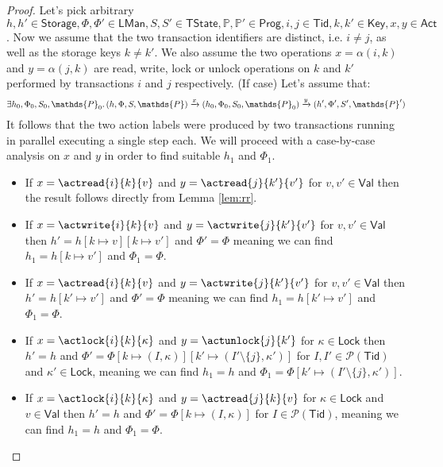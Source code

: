 \begin{proof}
Let's pick arbitrary $h, h' \in \mathsf{Storage}, \Phi, \Phi' \in \mathsf{LMan}, S, S' \in \mathsf{TState}, \mathds{P}, \mathds{P}' \in \mathsf{Prog}, i, j \in \mathsf{Tid}, k, k' \in \mathsf{Key}, x, y \in \mathsf{Act}$. Now we assume that the two transaction identifiers are distinct, i.e. $i \neq j$, as well as the storage keys $k \neq k'$. We also assume the two operations $x = \alpha(i, k)$ and $y = \alpha(j, k)$ are read, write, lock or unlock operations on $k$ and $k'$ performed by transactions $i$ and $j$ respectively. (If case) Let's assume that:
\begin{gather} \label{lem:xy1}
	\exists h_0, \Phi_0, S_0, \mathds{P}_0 \ldotp
	(h, \Phi, S, \mathds{P}) \xrightarrow{x} (h_0, \Phi_0, S_0, \mathds{P}_0)  \xrightarrow{y} (h', \Phi', S', \mathds{P}')
\end{gather}
It follows that the two action labels were produced by two transactions running in parallel executing a single step each. We will proceed with a case-by-case analysis on $x$ and $y$ in order to find suitable $h_1$ and $\Phi_1$.
\begin{itemize}
	\item If $x = \actread{i}{k}{v}$ and $y = \actread{j}{k'}{v'}$ for $v, v' \in \mathsf{Val}$ then the result follows directly from Lemma \ref{lem:rr}.
	\item If $x = \actwrite{i}{k}{v}$ and $y = \actwrite{j}{k'}{v'}$ for $v, v' \in \mathsf{Val}$ then $h' = h[k \mapsto v][k \mapsto v']$ and $\Phi' = \Phi$ meaning we can find $h_1 = h[k \mapsto v']$ and $\Phi_1 = \Phi$.
	\item If $x = \actread{i}{k}{v}$ and $y = \actwrite{j}{k'}{v'}$ for $v, v' \in \mathsf{Val}$ then $h' = h[k' \mapsto v']$ and $\Phi' = \Phi$ meaning we can find $h_1 = h[k' \mapsto v']$ and $\Phi_1 = \Phi$.
	\item If $x = \actlock{i}{k}{\kappa}$ and $y = \actunlock{j}{k'}$ for $\kappa \in \mathsf{Lock}$ then $h' = h$ and $\Phi' = \Phi[k \mapsto (I, \kappa)][k' \mapsto (I' \setminus \{j\}, \kappa')]$ for $I, I' \in \mathcal{P}(\mathsf{Tid})$ and $\kappa' \in \mathsf{Lock}$, meaning we can find $h_1 = h$ and $\Phi_1 = \Phi[k' \mapsto (I' \setminus \{j\}, \kappa')]$.
	\item If $x = \actlock{i}{k}{\kappa}$ and $y = \actread{j}{k}{v}$ for $\kappa \in \mathsf{Lock}$ and $v \in \mathsf{Val}$ then $h' = h$ and $\Phi' = \Phi[k \mapsto (I, \kappa)]$ for $I \in \mathcal{P}(\mathsf{Tid})$, meaning we can find $h_1 = h$ and $\Phi_1 = \Phi$.

\end{itemize}
\end{proof}
